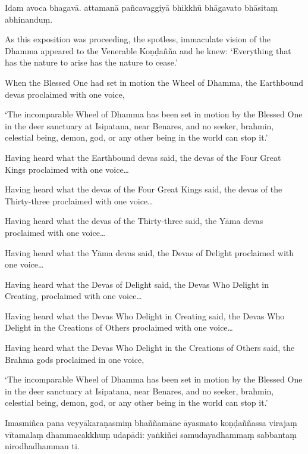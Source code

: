 
Idam avoca bhagavā. attamanā pañcavaggiyā bhikkhū bhāgavato bhāsitaṃ
abhinanduṃ.

\clearpage

\englishText
\markboth{\englishTitle}{\rightmark}

As this exposition was proceeding, the spotless, immaculate vision of
the Dhamma appeared to the Venerable Koṇḍañña and he knew: ‘Everything
that has the nature to arise has the nature to cease.’

When the Blessed One had set in motion the Wheel of Dhamma, the
Earthbound devas proclaimed with one voice,

‘The incomparable Wheel of Dhamma has been set in motion by the Blessed
One in the deer sanctuary at Isipatana, near Benares, and no seeker,
brahmin, celestial being, demon, god, or any other being in the world
can stop it.’

Having heard what the Earthbound devas said, the devas of the Four Great
Kings proclaimed with one voice\ldots

Having heard what the devas of the Four Great Kings said, the devas of
the Thirty-three proclaimed with one voice\ldots

Having heard what the devas of the Thirty-three said, the Yāma devas
proclaimed with one voice\ldots

Having heard what the Yāma devas said, the Devas of Delight proclaimed
with one voice\ldots

Having heard what the Devas of Delight said, the Devas Who Delight in
Creating, proclaimed with one voice\ldots

Having heard what the Devas Who Delight in Creating said, the Devas Who
Delight in the Creations of Others proclaimed with one voice\ldots

Having heard what the Devas Who Delight in the Creations of Others said,
the Brahma gods proclaimed in one voice,

‘The incomparable Wheel of Dhamma has been set in motion by the Blessed
One in the deer sanctuary at Isipatana, near Benares, and no seeker,
brahmin, celestial being, demon, god, or any other being in the world
can stop it.’

\clearpage

\paliText
\markboth{\paliTitle}{\rightmark}

Imasmiñca pana veyyākaraṇasmiṃ bhaññamāne āyasmato koṇḍaññassa virajaṃ
vītamalaṃ dhammacakkhuṃ udapādi: yaṅkiñci samudayadhammaṃ sabbantaṃ
nirodhadhamman ti.

